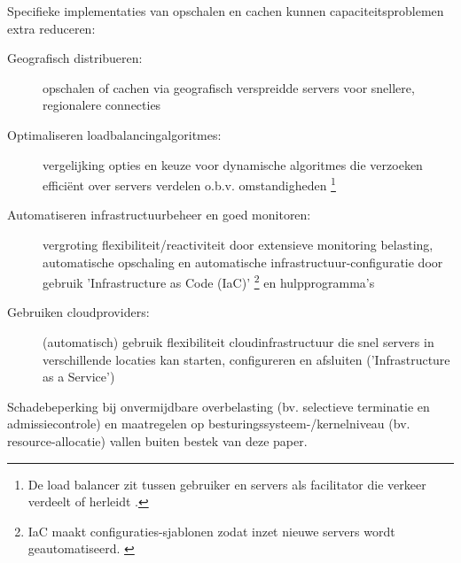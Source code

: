 Specifieke implementaties van opschalen en cachen kunnen capaciteitsproblemen
extra reduceren:

\begin{description}
    \item [Geografisch distribueren:] opschalen of cachen via
    geografisch verspreidde servers voor snellere, regionalere connecties
    \cite{sivasubramanian2007analysis, chenhao2017mitigating,
    colajanni1998dynamic}
    
    \item [Optimaliseren loadbalancingalgoritmes:] vergelijking opties 
    en keuze voor dynamische algoritmes die verzoeken efficiënt over
    servers verdelen o.b.v. omstandigheden
    \cite{mourad1997scalable, zhou2023comparative, amazon2023whatisload}
    \footnote{De load balancer zit tussen gebruiker en servers als
    facilitator die verkeer verdeelt of herleidt \cite{amazon2023whatisload}.}

    \item [Automatiseren infrastructuurbeheer en goed monitoren:] vergroting
    flexibiliteit/reactiviteit door extensieve monitoring belasting,
    automatische opschaling en automatische infrastructuur-configuratie
    door gebruik 'Infrastructure as Code (IaC)'
    \footnote{IaC maakt configuraties-sjablonen zodat inzet nieuwe
    servers wordt geautomatiseerd. \cite{microsoft2023wat}}
    en hulpprogramma's \cite{microsoft2023wat}
    
    \item [Gebruiken cloudproviders:] (automatisch) gebruik flexibiliteit
    cloudinfrastructuur die snel
    servers in verschillende locaties
    kan starten, configureren en afsluiten ('Infrastructure as a Service') 
    \cite{microsoft2023wat, gandhi2018modeldriven, hwang2014scaleout,
    chenhao2017mitigating}

\end{description}

Schadebeperking bij onvermijdbare overbelasting
(bv. selectieve terminatie en admissiecontrole) en maatregelen op
besturingssysteem-/kernelniveau (bv. resource-allocatie)
vallen buiten bestek van deze paper.